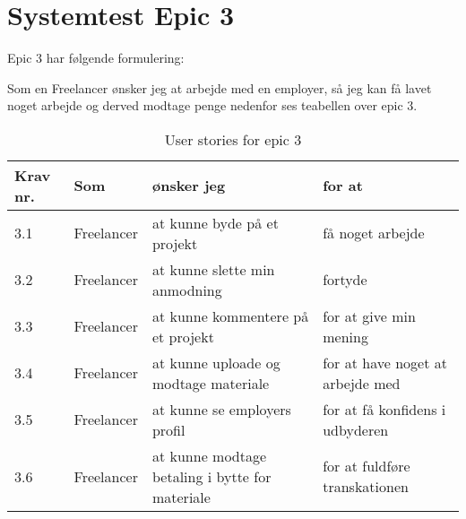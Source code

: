\chapter{Systemtest Epic 3}
Epic 3 har følgende formulering:

Som en Freelancer ønsker jeg at arbejde med en employer, så jeg kan få lavet noget arbejde og derved modtage penge
nedenfor ses teabellen over epic 3.

\begin{table}[H]
    \centering
    \caption{User stories for epic 3}
    \label{tab:us-epic3}
    \begin{tabular}{p{1cm}|p{2cm}|p{6cm}|p{6cm}}
        \textbf{Krav nr.} & \textbf{Som} & \textbf{ønsker jeg}                             & \textbf{for at}                  \\
        \hline
        3.1               & Freelancer   & at kunne byde på et projekt                     & få noget arbejde                 \\
        \hline
        3.2               & Freelancer   & at kunne slette min anmodning                   & fortyde                          \\
        \hline
        3.3               & Freelancer   & at kunne kommentere på et projekt               & for at give min mening           \\
        \hline
        3.4               & Freelancer   & at kunne uploade og modtage materiale           & for at have noget at arbejde med \\
        \hline
        3.5               & Freelancer   & at kunne se employers profil                    & for at få konfidens i udbyderen  \\
        \hline
        3.6               & Freelancer   & at kunne modtage betaling i bytte for materiale & for at fuldføre transkationen    \\
    \end{tabular}
\end{table}



